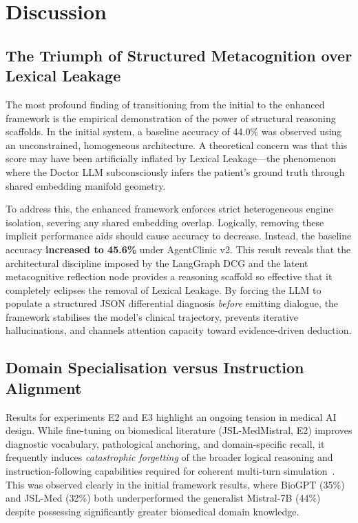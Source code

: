 \chapter{Discussion}
\label{Chapter7}

\section{The Triumph of Structured Metacognition over Lexical Leakage}

The most profound finding of transitioning from the initial to the enhanced framework is the empirical demonstration of the power of structural reasoning scaffolds. In the initial system, a baseline accuracy of 44.0\% was observed using an unconstrained, homogeneous architecture. A theoretical concern was that this score may have been artificially inflated by Lexical Leakage---the phenomenon where the Doctor LLM subconsciously infers the patient's ground truth through shared embedding manifold geometry.

To address this, the enhanced framework enforces strict heterogeneous engine isolation, severing any shared embedding overlap. Logically, removing these implicit performance aids should cause accuracy to decrease. Instead, the baseline accuracy \textbf{increased to 45.6\%} under AgentClinic v2. This result reveals that the architectural discipline imposed by the LangGraph DCG and the latent metacognitive reflection node provides a reasoning scaffold so effective that it completely eclipses the removal of Lexical Leakage. By forcing the LLM to populate a structured JSON differential diagnosis \textit{before} emitting dialogue, the framework stabilises the model's clinical trajectory, prevents iterative hallucinations, and channels attention capacity toward evidence-driven deduction.

\section{Domain Specialisation versus Instruction Alignment}

Results for experiments E2 and E3 highlight an ongoing tension in medical AI design. While fine-tuning on biomedical literature (JSL-MedMistral, E2) improves diagnostic vocabulary, pathological anchoring, and domain-specific recall, it frequently induces \textit{catastrophic forgetting} of the broader logical reasoning and instruction-following capabilities required for coherent multi-turn simulation~\cite{tang2023medagents}. This was observed clearly in the initial framework results, where BioGPT (35\%) and JSL-Med (32\%) both underperformed the generalist Mistral-7B (44\%) despite possessing significantly greater biomedical domain knowledge.

